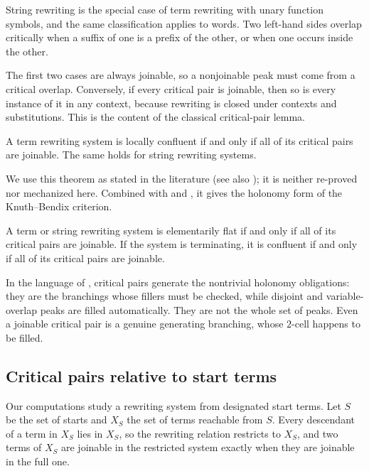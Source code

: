 String rewriting is the special case of term rewriting with unary function symbols, and the same classification applies to words. Two left-hand sides overlap critically when a suffix of one is a prefix of the other, or when one occurs inside the other.

The first two cases are always joinable, so a nonjoinable peak must come from a critical overlap. Conversely, if every critical pair is joinable, then so is every instance of it in any context, because rewriting is closed under contexts and substitutions. This is the content of the classical critical-pair lemma.

\begin{theorem}
\label{thm:critical-pair-lemma}
A term rewriting system is locally confluent if and only if all of its critical pairs are joinable. The same holds for string rewriting systems.
\end{theorem}

We use this theorem as stated in the literature (see also \cite[Chapter~6]{BaaderNipkow1998}); it is neither re-proved nor mechanized here. Combined with  and , it gives the holonomy form of the Knuth--Bendix criterion.

\begin{corollary}
\label{cor:cp-flatness}
A term or string rewriting system is elementarily flat if and only if all of its critical pairs are joinable. If the system is terminating, it is confluent if and only if all of its critical pairs are joinable.
\end{corollary}

In the language of , critical pairs generate the nontrivial holonomy obligations: they are the branchings whose fillers must be checked, while disjoint and variable-overlap peaks are filled automatically. They are not the whole set of peaks. Even a joinable critical pair is a genuine generating branching, whose $2$-cell happens to be filled.

\subsection{Critical pairs relative to start terms}
\label{subsec:string-critical-pairs}
\label{subsec:reachable-critical-pairs-vs-peaks}

Our computations study a rewriting system from designated start terms. Let $S$ be the set of starts and $X_S$ the set of terms reachable from $S$. Every descendant of a term in $X_S$ lies in $X_S$, so the rewriting relation restricts to $X_S$, and two terms of $X_S$ are joinable in the restricted system exactly when they are joinable in the full one.

